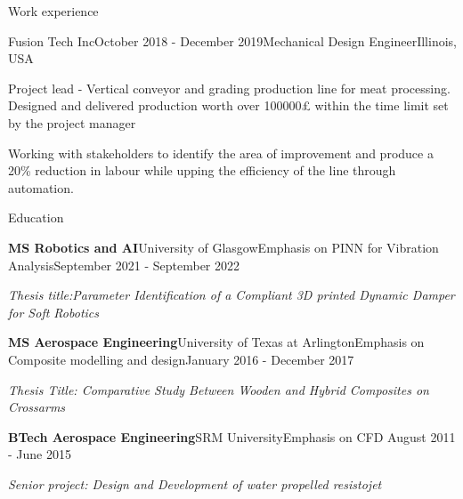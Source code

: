 \documentclass{resume} %
\newcommand{\italicitem}[1]{\item{\textit{#1}}}
\begin{document}
\begin{rSection}{Work experience}
    \begin{rSubsection}{Fusion Tech Inc}{October 2018 - December 2019}{Mechanical Design Engineer}{Illinois, USA}
        
        \item Project lead - Vertical conveyor and grading production line for meat processing. Designed and delivered production worth over 100000£ within the time limit set by the project manager

        \item Working with stakeholders to identify the area of improvement and produce a 20\% reduction in labour while upping the efficiency of the line through automation.
    \end{rSubsection}
    
\end{rSection}

\begin{rSection}{Education}

    \begin{rSubsectionNoBullet}{\bf MS Robotics and AI}{University of Glasgow}{Emphasis on PINN for Vibration Analysis}{September 2021 - September 2022}
        
        \italicitem{Thesis title:Parameter Identification of a Compliant 3D printed Dynamic Damper for Soft Robotics }
    \end{rSubsectionNoBullet}
    
    \begin{rSubsectionNoBullet}{\bf MS Aerospace Engineering}{University of Texas at Arlington}{Emphasis on Composite modelling and design}{January 2016 - December 2017}
        
        \italicitem{Thesis Title: Comparative Study Between Wooden and Hybrid Composites on Crossarms}
    \end{rSubsectionNoBullet}
    
    \begin{rSubsectionNoBullet}{\bf BTech Aerospace Engineering}{SRM University}{Emphasis on CFD }{August 2011 - June 2015}

        \italicitem{Senior project: Design and Development of water propelled resistojet}
    \end{rSubsectionNoBullet}

\end{rSection}
\end{document}
